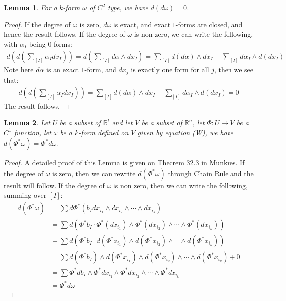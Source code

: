 \documentclass[11pt,oneside]{book}
\theoremstyle{break}
\theoremstyle{break}
\newtheorem{lem}{Lemma}[thm]
\newcommand{\R}{\mathbb{R}}
\begin{document}
\begin{lem}
For a $k$-form $\omega$ of $C^2$ type, we have $d(d\omega) = 0$.
\end{lem}
\begin{proof}
If the degree of $\omega$ is zero, $d\omega$ is exact, and exact $1$-forms are closed, and hence the result follows. If the degree of $\omega$ is non-zero, we can write the following, with $\alpha_I$ being $0$-forms:
\begin{align*}
d\left( d\left(\sum_{[I]} \alpha_I dx_I \right) \right) = d\left(\sum_{[I]} d\alpha \wedge dx_I\right) = \sum_{[I]} d(d \alpha) \wedge dx_I - \sum_{[I]} d\alpha_I \wedge d(d x_I)
\end{align*}
Note here $d\alpha$ is an exact $1$-form, and $dx_j$ is exactly one form for all $j$, then we see that:
\begin{align*}
d\left( d\left(\sum_{[I]} \alpha_I dx_I \right) \right) =\sum_{[I]} d(d \alpha) \wedge dx_I - \sum_{[I]} d\alpha_I \wedge d(d x_I) = 0
\end{align*}
The result follows.
\end{proof}

\begin{lem}
Let $U$ be a subset of $\R^l$ and let $V$ be a subset of $\R^n$, let $\Phi:U \to V$ be a $C^1$ function, let $\omega$ be a $k$-form defined on $V$ given by equation (W), we have $d(\Phi^* \omega) = \Phi^* d\omega$.
\end{lem}
\begin{proof}
A detailed proof of this Lemma is given on Theorem 32.3 in Munkres. If the degree of $\omega$ is zero, then we can rewrite $d(\Phi^* \omega)$  through Chain Rule and the result will follow. If the degree of $\omega$ is non zero, then we can write the following, summing over $[I]$:
\begin{align*}
d(\Phi^* \omega) &= \sum d\Phi^*(b_I dx_{i_1}\wedge dx_{i_2}\wedge \cdots \wedge dx_{i_k})\\
&= \sum d\left(\Phi^*b_I \cdot \Phi^*(dx_{i_1})\wedge \Phi^*(dx_{i_2})\wedge \cdots \wedge \Phi^*(dx_{i_k}) \right)\\
&= \sum d(\Phi^*b_I \cdot d(\Phi^*x_{i_1}) \wedge d(\Phi^*x_{i_2})\wedge \cdots \wedge d(\Phi^*x_{i_k}) )\\
&= \sum d(\Phi^*b_I) \wedge d(\Phi^*x_{i_1}) \wedge d(\Phi^*x_{i_2}) \wedge \cdots \wedge d(\Phi^*x_{i_k}) +0 \\
&= \sum \Phi^*db_I \wedge \Phi^* dx_{i_1} \wedge \Phi^* dx_{i_2} \wedge \cdots \wedge \Phi^* dx_{i_k}\\
&= \Phi^* d\omega
\end{align*}
\end{proof}
\end{document}
